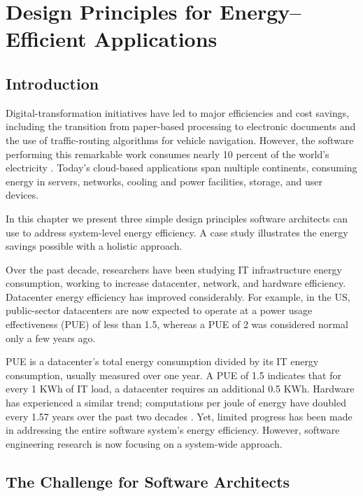 \chapter{Design Principles for Energy--Efficient Applications}


\section{Introduction}

Digital-transformation initiatives have led to major efficiencies and cost savings, including the transition from paper-based processing to electronic documents and the use of traffic-routing algorithms for vehicle navigation. However, the software performing this remarkable work consumes nearly 10 percent of the world's electricity \cite{mills2013-digital-energyusage}. Today's cloud-based applications span multiple continents, consuming energy in servers, networks, cooling and power facilities, storage, and user devices.

In this chapter we present three simple design principles software architects can use to address system-level energy efficiency. A case study illustrates the energy savings possible with a holistic approach.

Over the past decade, researchers have been studying IT infrastructure energy consumption, working to increase datacenter, network, and hardware efficiency. Datacenter energy efficiency has improved considerably. For example, in the US, public-sector datacenters are now expected to operate at a power usage effectiveness (PUE) of less than 1.5, whereas a PUE of 2 was considered normal only a few years ago.

PUE is a datacenter's total energy consumption divided by its IT energy consumption, usually measured over one year. A PUE of 1.5 indicates that for every 1 KWh of IT load, a datacenter requires an additional 0.5 KWh.
Hardware has experienced a similar trend; computations per joule of energy have doubled every 1.57 years over the past two decades \cite{koomey2011-trends-energy-efficiency}. Yet, limited progress has been made in addressing the entire software system's energy efficiency. However, software engineering research is now focusing on a system-wide approach.

\section{The Challenge for Software Architects}

